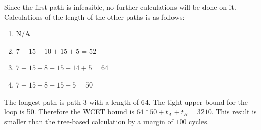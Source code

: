     Since the first path is infeasible, no further calculations will be done on it. Calculations of the length of the other paths is as follows:
    \begin{enumerate}
        \item N/A
        \item $7+15+10+15+5 = 52$
        \item $7+15+8+15+14+5 = 64$
        \item $7+15+8+15+5 = 50$
    \end{enumerate}

    The longest path is path 3 with a length of 64. The tight upper bound for the loop is 50. Therefore the WCET bound is $64*50 + t_A + t_B = 3210$. This result is smaller than the tree-based calculation by a margin of $100$ cycles.


